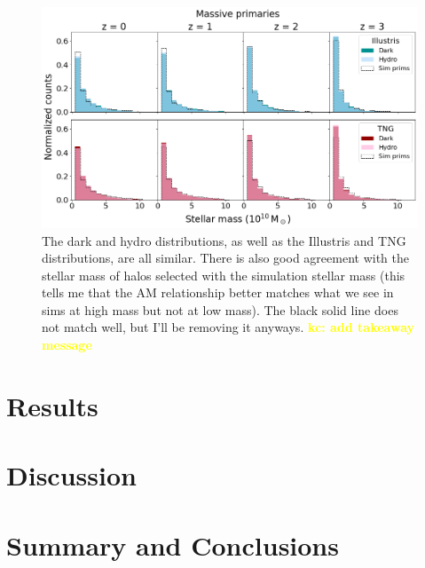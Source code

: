 \documentclass[twocolumn]{aastex631}
\newcommand{\kc}[1]{\textcolor{yellow}{\textbf{kc: #1}} }
\begin{document}
\begin{figure}[htb]
  \centering
  \includegraphics[width=\textwidth]{distributions_stellarmass_massive.png}
  \caption{The dark and hydro distributions, as well as the Illustris and TNG distributions, are all similar. There is also good agreement with the stellar mass of halos selected with the simulation stellar mass (this tells me that the AM relationship better matches what we see in sims at high mass but not at low mass). The black solid line does not match well, but I'll be removing it anyways. \kc{ add takeaway message}
    }
  \label{fig:dist-stellmass-massive}
\end{figure}


\section{Results}
\label{sec:results}


\section{Discussion}
\label{sec:discussion}


\section{Summary and Conclusions}
\label{sec:summary}


{}

\end{document}
